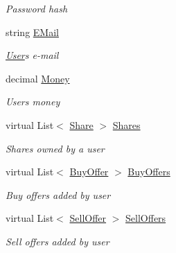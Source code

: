 \begin{DoxyCompactItemize}
\begin{DoxyCompactList}\small\item\em Password hash \end{DoxyCompactList}\item 
string \mbox{\hyperlink{class_gielda_l2_1_1_d_b_1_1_entities_1_1_user_acbb08bc936b605c2e371dcdaa8597c73}{E\+Mail}}
\begin{DoxyCompactList}\small\item\em \mbox{\hyperlink{class_gielda_l2_1_1_d_b_1_1_entities_1_1_user}{User}}\textquotesingle{}s e-\/mail \end{DoxyCompactList}\item 
decimal \mbox{\hyperlink{class_gielda_l2_1_1_d_b_1_1_entities_1_1_user_a3e4d2c629ce72c856449a96ccc19d2b1}{Money}}
\begin{DoxyCompactList}\small\item\em Users money \end{DoxyCompactList}\item 
virtual List$<$ \mbox{\hyperlink{class_gielda_l2_1_1_d_b_1_1_entities_1_1_share}{Share}} $>$ \mbox{\hyperlink{class_gielda_l2_1_1_d_b_1_1_entities_1_1_user_ab46f7d5d748ace49f1d11b176e3527d9}{Shares}}
\begin{DoxyCompactList}\small\item\em Shares owned by a user \end{DoxyCompactList}\item 
virtual List$<$ \mbox{\hyperlink{class_gielda_l2_1_1_d_b_1_1_entities_1_1_buy_offer}{Buy\+Offer}} $>$ \mbox{\hyperlink{class_gielda_l2_1_1_d_b_1_1_entities_1_1_user_a5b0480cdb2ac0b76c9a0e0a1b01abd0b}{Buy\+Offers}}
\begin{DoxyCompactList}\small\item\em Buy offers added by user \end{DoxyCompactList}\item 
virtual List$<$ \mbox{\hyperlink{class_gielda_l2_1_1_d_b_1_1_entities_1_1_sell_offer}{Sell\+Offer}} $>$ \mbox{\hyperlink{class_gielda_l2_1_1_d_b_1_1_entities_1_1_user_a848ae6100077db7dab7e99f9a7a46c93}{Sell\+Offers}}
\begin{DoxyCompactList}\small\item\em Sell offers added by user \end{DoxyCompactList}\end{DoxyCompactItemize}



